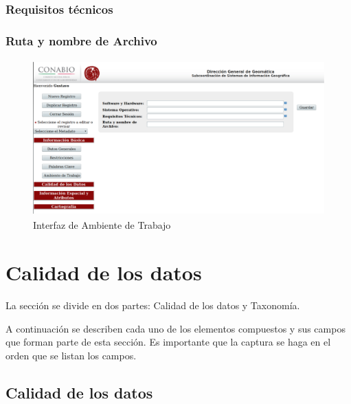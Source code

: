 \documentclass[twoside]{book}
\begin{document}
\subsection{Requisitos técnicos}

\subsection{Ruta y nombre de Archivo}



\begin{figure}[h] %
	\includegraphics[width=12cm, height=6cm]{img/software} %
	\caption{Interfaz de Ambiente de Trabajo}
\end{figure}









\chapter{Calidad de los datos}

La sección se divide en dos partes: Calidad de los datos y Taxonomía.

A continuación se describen cada uno de los elementos compuestos y sus campos que forman parte de esta sección. Es importante que la captura se haga en el orden que se listan los campos.
\section{Calidad de los datos}
\end{document}
